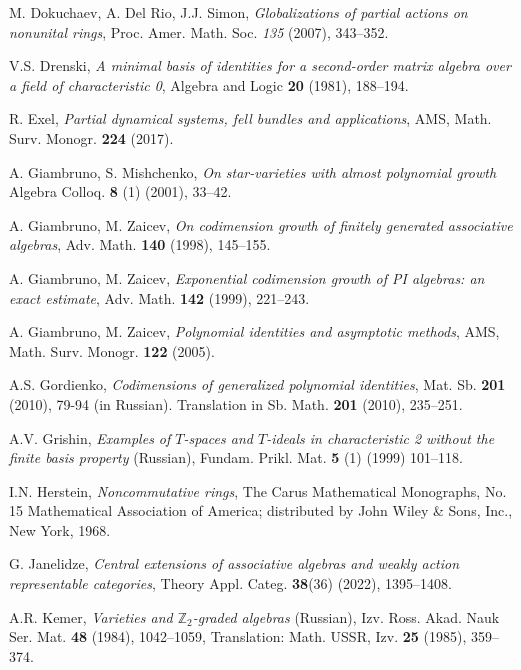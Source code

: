 \documentclass[reqno]{amsart}
\theoremstyle{definition}
\numberwithin{equation}{section}
\numberwithin{theorem}{section}
\begin{document}
\begin{thebibliography}{}
 M. Dokuchaev, A. Del Rio, J.J. Simon, {\em Globalizations of partial actions on nonunital rings}, Proc. Amer. Math. Soc. {\em 135} (2007), 343--352.

 V.S. Drenski, {\em A minimal basis of identities for a second-order matrix algebra over a field of characteristic 0}, Algebra and Logic \textbf{20} (1981), 188--194.

 R. Exel,  \textit{Partial dynamical systems, fell bundles and applications}, AMS, Math. Surv. Monogr. {\bf 224} (2017).

 A. Giambruno, S. Mishchenko, {\em On star-varieties with almost polynomial growth} Algebra Colloq. \textbf{8} (1) (2001), 33--42.

	 A. Giambruno, M. Zaicev, {\em On codimension growth of finitely generated associative algebras}, Adv. Math. {\bf 140} (1998), 145--155.
	
	 A. Giambruno, M. Zaicev, {\em Exponential codimension growth of PI algebras: an exact estimate}, Adv. Math. {\bf 142} (1999), 221--243.
    
 A. Giambruno, M. Zaicev,  \textit{Polynomial identities and asymptotic methods}, AMS, Math. Surv. Monogr. {\bf 122} (2005).

 A.S. Gordienko, {\em Codimensions of generalized polynomial identities}, Mat. Sb. {\bf 201} (2010), 79-94 (in Russian). Translation in Sb. Math. {\bf 201} (2010), 235--251.

 A.V. Grishin, {\em Examples of $T$-spaces and $T$-ideals in characteristic 2 without the finite basis property} (Russian), Fundam. Prikl. Mat. \textbf{5} (1) (1999) 101--118.

 I.N. Herstein,  \textit{Noncommutative rings}, The Carus Mathematical Monographs, No. 15 Mathematical Association of America; distributed by John Wiley \& Sons, Inc., New York, 1968.

 G. Janelidze, {\em Central extensions of associative algebras and weakly action representable
categories}, Theory Appl. Categ. {\bf 38}(36) (2022), 1395--1408.

 A.R. Kemer, {\em Varieties and $\mathbb{Z}_2$-graded algebras} (Russian), Izv. Ross. Akad. Nauk Ser. Mat. \textbf{48} (1984), 1042--1059, Translation: Math. USSR, Izv. \textbf{25} (1985), 359--374.


\end{thebibliography}
\end{document}
